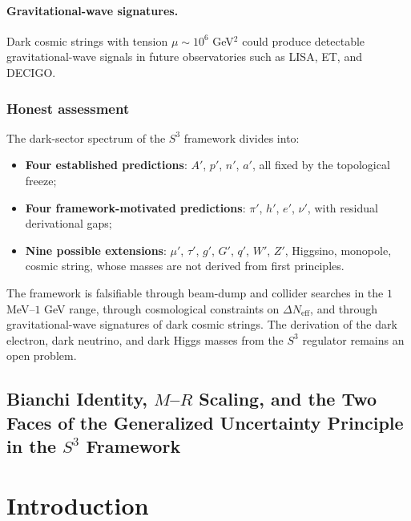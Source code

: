 \documentclass[a4paper,7pt,oneside,openany]{book}
\begin{document}
\paragraph{Gravitational-wave signatures.}
Dark cosmic strings with tension $\mu\sim 10^{6}$ GeV$^{2}$ could 
produce detectable gravitational-wave signals in future 
observatories such as LISA, ET, and DECIGO.

\subsubsection{Honest assessment}

The dark-sector spectrum of the $S^{3}$ framework divides into:
\begin{itemize}
\item \textbf{Four established predictions}: $A'$, $p'$, $n'$, 
$a'$, all fixed by the topological freeze;
\item \textbf{Four framework-motivated predictions}: $\pi'$, 
$h'$, $e'$, $\nu'$, with residual derivational gaps;
\item \textbf{Nine possible extensions}: $\mu'$, $\tau'$, $g'$, 
$G'$, $q'$, $W'$, $Z'$, Higgsino, monopole, cosmic string, whose 
masses are not derived from first principles.
\end{itemize}
The framework is falsifiable through beam-dump and collider 
searches in the $1$ MeV--$1$ GeV range, through cosmological 
constraints on $\Delta N_{\text{eff}}$, and through 
gravitational-wave signatures of dark cosmic strings. The 
derivation of the dark electron, dark neutrino, and dark Higgs 
masses from the $S^{3}$ regulator remains an open problem.


\subsection{Bianchi Identity, $M$--$R$ Scaling, and the Two Faces of the Generalized Uncertainty Principle in the $S^{3}$ Framework}


\section{Introduction}
\end{document}
